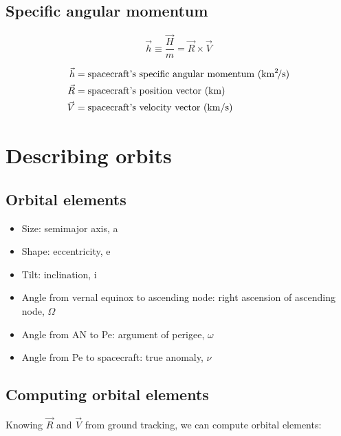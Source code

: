 \documentclass{article}
\begin{document}
\subsection{Specific angular momentum}
\begin{multicols}{3}
	\begin{equation*}
	\boxed{\vec{h} \equiv \dfrac{\vec{H}}{m} = \vec{R} \times \vec{V}}
	\end{equation*}

	\vfill\null
	\columnbreak

	\begin{align*}
	\vec{h} &= \text{spacecraft's specific angular momentum (\si{\kilo\meter\squared\per\second})}\\
	\vec{R} &= \text{spacecraft's position vector (\si{\kilo\meter})}\\
	\vec{V} &= \text{spacecraft's velocity vector (\si{\kilo\meter\per\second})}\\
	\end{align*}
\end{multicols}

\section{Describing orbits}
\subsection{Orbital elements}
\begin{itemize}
	\item Size: semimajor axis, a
	\item Shape: eccentricity, e
	\item Tilt: inclination, i
	\item Angle from vernal equinox to ascending node: right ascension of ascending node, $\Omega$
	\item Angle from AN to Pe: argument of perigee, $\omega$
	\item Angle from Pe to spacecraft: true anomaly, $\nu$
\end{itemize}

\subsection{Computing orbital elements}
Knowing $\vec{R}$ and $\vec{V}$ from ground tracking, we can compute orbital elements:
\end{document}
